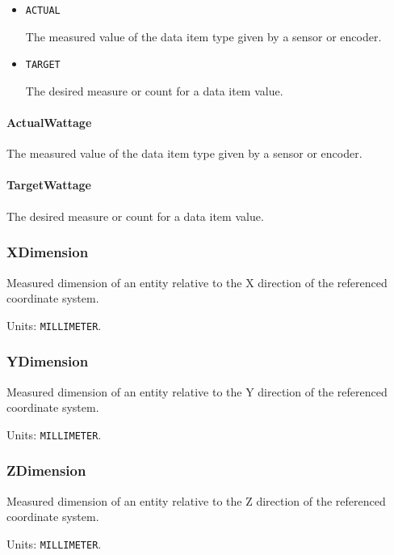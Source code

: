 \begin{itemize}

\item \texttt{ACTUAL}


The measured value of the data item type given by a sensor or encoder.

\item \texttt{TARGET}


The desired measure or count for a data item value.


\end{itemize}

\paragraph{ActualWattage}\mbox{}
\label{sec:ActualWattage}


The measured value of the data item type given by a sensor or encoder.


\paragraph{TargetWattage}\mbox{}
\label{sec:TargetWattage}


The desired measure or count for a data item value.


\subsubsection{XDimension}
\label{sec:XDimension}



Measured dimension of an entity relative to the X direction of the referenced coordinate system.


Units: \texttt{MILLIMETER}.

\subsubsection{YDimension}
\label{sec:YDimension}



Measured dimension of an entity relative to the Y direction of the referenced coordinate system.


Units: \texttt{MILLIMETER}.

\subsubsection{ZDimension}
\label{sec:ZDimension}



Measured dimension of an entity relative to the Z direction of the referenced coordinate system.


Units: \texttt{MILLIMETER}.
